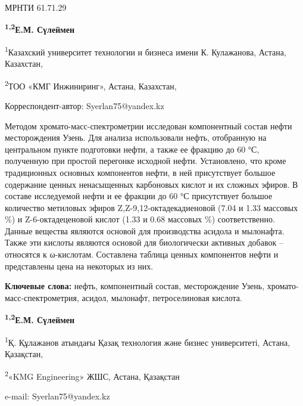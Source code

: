 \newpage
МРНТИ 61.71.29


\begin{center}
{\bfseries \textsuperscript{1,2}Е.М. Сүлеймен}

\textsuperscript{1}Казахский университет технологии и бизнеса имени К.
Кулажанова, Астана, Казахстан,

\textsuperscript{2}ТОО «КМГ Инжиниринг», Астана, Казахстан,
\end{center}

Корреспондент-автор: Syerlan75@yandex.kz

Методом хромато-масс-спектрометрии исследован компонентный состав нефти
месторождения Узень. Для анализа использовали нефть, отобранную на
центральном пункте подготовки нефти, а также ее фракцию до 60 °С,
полученную при простой перегонке исходной нефти. Установлено, что кроме
традиционных основных компонентов нефти, в ней присутствует большое
содержание ценных ненасыщенных карбоновых кислот и их сложных эфиров. В
составе исследуемой нефти и ее фракции до 60 °С присутствует большое
количество метиловых эфиров Z,Z-9,12-октадекадиеновой (7.04 и 1.33
массовых \%) и Z-6-октадеценовой кислот (1.33 и 0.68 массовых \%)
соответственно. Данные вещества являются основой для производства
асидола и мылонафта. Также эти кислоты являются основой для биологически
активных добавок -- относятся к ω-кислотам. Составлена таблица ценных
компонентов нефти и представлены цена на некоторых из них.

{\bfseries Ключевые слова:} нефть, компонентный состав, месторождение
Узень, хромато-масс-спектрометрия, асидол, мылонафт, петроселиновая
кислота.


\begin{center}
{\bfseries \textsuperscript{1,2}Е.М. Сүлеймен}

\textsuperscript{1}Қ. Құлажанов атындағы Қазақ технология және бизнес
университеті, Астана, Қазақстан,

\textsuperscript{2}«KMG Engineering» ЖШС, Астана, Қазақстан

e-mail: Syerlan75@yandex.kz
\end{center}

